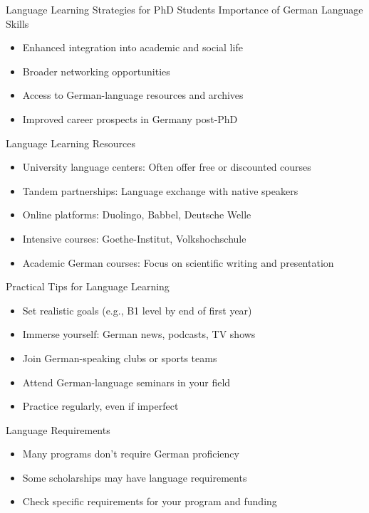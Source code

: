 \documentclass[aspectratio=169,10pt]{beamer}
\begin{document}
\begin{frame}{Language Learning Strategies for PhD Students}
\alert{Importance of German Language Skills}
\begin{itemize}
    \item Enhanced integration into academic and social life
    \item Broader networking opportunities
    \item Access to German-language resources and archives
    \item Improved career prospects in Germany post-PhD
\end{itemize}

\alert{Language Learning Resources}
\begin{itemize}
    \item University language centers: Often offer free or discounted courses
    \item Tandem partnerships: Language exchange with native speakers
    \item Online platforms: Duolingo, Babbel, Deutsche Welle
    \item Intensive courses: Goethe-Institut, Volkshochschule
    \item Academic German courses: Focus on scientific writing and presentation
\end{itemize}

\alert{Practical Tips for Language Learning}
\begin{itemize}
    \item Set realistic goals (e.g., B1 level by end of first year)
    \item Immerse yourself: German news, podcasts, TV shows
    \item Join German-speaking clubs or sports teams
    \item Attend German-language seminars in your field
    \item Practice regularly, even if imperfect
\end{itemize}

\alert{Language Requirements}
\begin{itemize}
    \item Many programs don't require German proficiency
    \item Some scholarships may have language requirements
    \item Check specific requirements for your program and funding
\end{itemize}
\end{frame}
\end{document}
